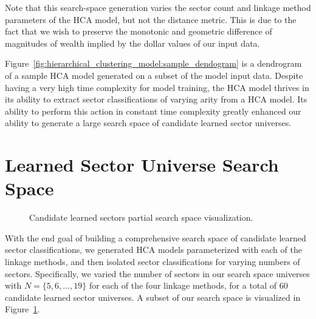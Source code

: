 \documentclass[../main.tex]{subfiles}
\begin{document}
Note that this search-space generation varies the sector count and linkage method parameters of the HCA model, but not the distance metric. This is due to the fact that we wish to preserve the monotonic and geometric difference of magnitudes of wealth implied by the dollar values of our input data.

Figure~\ref{fig:hierarchical_clustering_model:sample_dendogram} is a dendrogram of a sample HCA model generated on a subset of the model input data. Despite having a very high time complexity for model training, the HCA model thrives in its ability to extract sector classifications of varying arity from a HCA model. Its ability to perform this action in constant time complexity greatly enhanced our ability to generate a large search space of candidate learned sector universes.


\pagebreak

\section{Learned Sector Universe Search Space}


\begin{figure}[h]
    \centering
    \caption{Candidate learned sectors partial search space visualization.}
    \label{fig:hierarchical_clustering_model:partial_search_space}
\end{figure}

With the end goal of building a comprehensive search space of candidate learned sector classifications, we generated HCA models parameterized with each of the linkage methods, and then isolated sector classifications for varying numbers of sectors. Specifically, we varied the number of sectors in our search space universes with $N = \{5, 6, \ldots, 19 \}$ for each of the four linkage methods, for a total of 60 candidate learned sector universes. A subset of our search space is visualized in Figure~\ref{fig:hierarchical_clustering_model:partial_search_space}.
\end{document}
